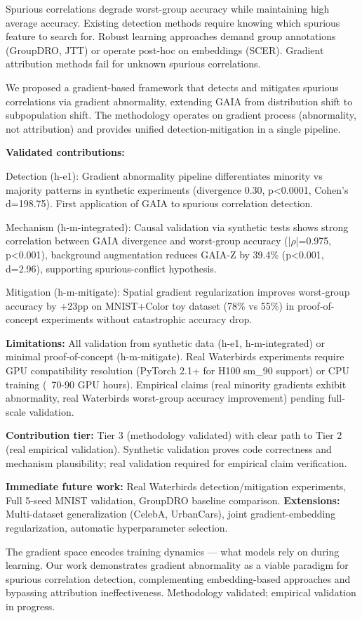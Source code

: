 
Spurious correlations degrade worst-group accuracy while maintaining high average accuracy. Existing detection methods require knowing which spurious feature to search for. Robust learning approaches demand group annotations (GroupDRO, JTT) or operate post-hoc on embeddings (SCER). Gradient attribution methods fail for unknown spurious correlations.

We proposed a gradient-based framework that detects and mitigates spurious correlations via gradient abnormality, extending GAIA from distribution shift to subpopulation shift. The methodology operates on gradient process (abnormality, not attribution) and provides unified detection-mitigation in a single pipeline.

\textbf{Validated contributions:}

Detection (h-e1): Gradient abnormality pipeline differentiates minority vs majority patterns in synthetic experiments (divergence 0.30, p<0.0001, Cohen's d=198.75). First application of GAIA to spurious correlation detection.

Mechanism (h-m-integrated): Causal validation via synthetic tests shows strong correlation between GAIA divergence and worst-group accuracy (|$\rho$|=0.975, p<0.001), background augmentation reduces GAIA-Z by 39.4\% (p<0.001, d=2.96), supporting spurious-conflict hypothesis.

Mitigation (h-m-mitigate): Spatial gradient regularization improves worst-group accuracy by +23pp on MNIST+Color toy dataset (78\% vs 55\%) in proof-of-concept experiments without catastrophic accuracy drop.

\textbf{Limitations:} All validation from synthetic data (h-e1, h-m-integrated) or minimal proof-of-concept (h-m-mitigate). Real Waterbirds experiments require GPU compatibility resolution (PyTorch 2.1+ for H100 sm\_90 support) or CPU training (~70-90 GPU hours). Empirical claims (real minority gradients exhibit abnormality, real Waterbirds worst-group accuracy improvement) pending full-scale validation.

\textbf{Contribution tier:} Tier 3 (methodology validated) with clear path to Tier 2 (real empirical validation). Synthetic validation proves code correctness and mechanism plausibility; real validation required for empirical claim verification.

\textbf{Immediate future work:} Real Waterbirds detection/mitigation experiments, Full 5-seed MNIST validation, GroupDRO baseline comparison. \textbf{Extensions:} Multi-dataset generalization (CelebA, UrbanCars), joint gradient-embedding regularization, automatic hyperparameter selection.

The gradient space encodes training dynamics --- what models rely on during learning. Our work demonstrates gradient abnormality as a viable paradigm for spurious correlation detection, complementing embedding-based approaches and bypassing attribution ineffectiveness. Methodology validated; empirical validation in progress.
